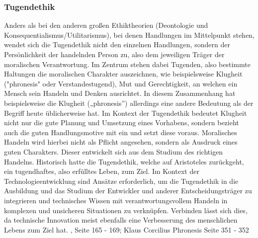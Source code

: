 \subsubsection{Tugendethik}
Anders als bei den anderen großen Ethiktheorien (Deontologie und Konsequentialismus/Utilitarismus), bei denen Handlungen im Mittelpunkt stehen, wendet sich die Tugendethik nicht den einzelnen Handlungen, sondern der Persönlichkeit der handelnden Person zu, also dem jeweiligen Träger der moralischen Verantwortung. Im Zentrum stehen dabei Tugenden, also bestimmte Haltungen die moralischen Charakter auszeichnen, wie beispielsweise Klugheit ("phronesis" oder Verstandestugend), Mut und Gerechtigkeit, an welchen ein Mensch sein Handeln und Denken ausrichtet. In diesem Zusammenhang hat beispielsweise die Klugheit („phronesis”) allerdings eine andere Bedeutung als der Begriff heute üblicherweise hat. Im Kontext der Tugendethik bedeutet Klugheit nicht nur die gute Planung und Umsetzung eines Vorhabens, sondern bezieht auch die guten Handlungsmotive mit ein und setzt diese voraus. Moralisches Handeln wird hierbei nicht als Pflicht angesehen, sondern als Ausdruck eines guten Charakters. Dieser entwickelt sich aus dem Studium des richtigen Handelns. Historisch hatte die Tugendethik, welche auf Aristoteles zurückgeht, ein tugendhaftes, also erfülltes Leben, zum Ziel. Im Kontext der Technologieentwicklung sind Ansätze erforderlich, um die Tugendethik in die Ausbildung und das Studium der Entwickler und anderer Entscheidungsträger zu integrieren und technisches Wissen mit verantwortungsvollem Handeln in komplexen und unsicheren Situationen zu verknüpfen. Verbinden lässt sich dies, da technische Innovation meist ebenfalls eine Verbesserung des menschlichen Lebens zum Ziel hat. \cite{grunwaldHandbuchTechnikethik2021}, Seite 165 - 169; Klaus Corcilius Phronesis Seite 351 - 352



